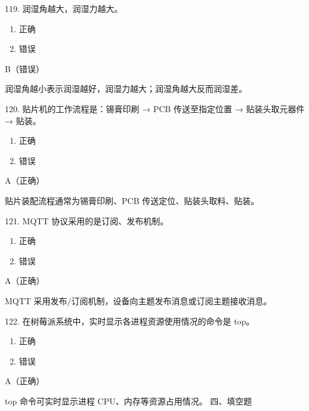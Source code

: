 \begin{question}{119. 润湿角越大，润湿力越大。}
\begin{enumerate}[label=\Alph*., leftmargin=2.4em, itemsep=0.2em]
\item 正确
\item 错误
\end{enumerate}
\end{question}
\begin{answer}
B（错误）
\end{answer}
\begin{explanation}
润湿角越小表示润湿越好，润湿力越大；润湿角越大反而润湿差。
\end{explanation}

\begin{question}{120. 贴片机的工作流程是：锡膏印刷 → PCB 传送至指定位置 → 贴装头取元器件 → 贴装。}
\begin{enumerate}[label=\Alph*., leftmargin=2.4em, itemsep=0.2em]
\item 正确
\item 错误
\end{enumerate}
\end{question}
\begin{answer}
A（正确）
\end{answer}
\begin{explanation}
贴片装配流程通常为锡膏印刷、PCB 传送定位、贴装头取料、贴装。
\end{explanation}

\begin{question}{121. MQTT 协议采用的是订阅、发布机制。}
\begin{enumerate}[label=\Alph*., leftmargin=2.4em, itemsep=0.2em]
\item 正确
\item 错误
\end{enumerate}
\end{question}
\begin{answer}
A（正确）
\end{answer}
\begin{explanation}
MQTT 采用发布/订阅机制，设备向主题发布消息或订阅主题接收消息。
\end{explanation}

\begin{question}{122. 在树莓派系统中，实时显示各进程资源使用情况的命令是 top。}
\begin{enumerate}[label=\Alph*., leftmargin=2.4em, itemsep=0.2em]
\item 正确
\item 错误
\end{enumerate}
\end{question}
\begin{answer}
A（正确）
\end{answer}
\begin{explanation}
top 命令可实时显示进程 CPU、内存等资源占用情况。 四、填空题
\end{explanation}

